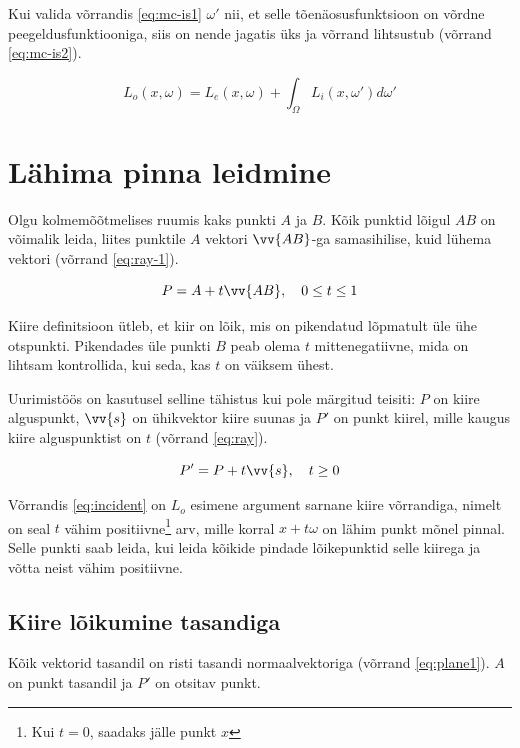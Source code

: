 \documentclass[a4paper,12pt]{report}
\renewcommand{\vec}[1]{\vv{#1}}
\begin{document}
Kui valida võrrandis \ref{eq:mc-is1} \(\omega'\) nii, et selle
tõenäosusfunktsioon on võrdne peegeldusfunktiooniga, siis on nende
jagatis üks ja võrrand lihtsustub (võrrand \ref{eq:mc-is2}).

\begin{equation} \label{eq:mc-is2}
L_o(x, \omega) = L_e(x, \omega) + \int_\Omega L_i(x, \omega') d\omega'
\end{equation}

\section{Lähima pinna leidmine}
Olgu kolmemõõtmelises ruumis kaks punkti \(A\) ja \(B\). Kõik punktid
lõigul \(AB\) on võimalik leida, liites punktile \(A\) vektori \(\vec{AB}\)-ga
samasihilise, kuid lühema vektori (võrrand \ref{eq:ray-1}).

\begin{equation} \label{eq:ray-1}
P = A + t\vec{AB}, \quad 0 \leq t \leq 1
\end{equation}

Kiire definitsioon ütleb, et kiir on lõik, mis on pikendatud lõpmatult
üle ühe otspunkti. Pikendades üle punkti \(B\) peab olema \(t\)
mittenegatiivne, mida on lihtsam kontrollida, kui seda, kas \(t\) on
väiksem ühest.

Uurimistöös on kasutusel selline tähistus kui pole märgitud teisiti:
\(P\) on kiire alguspunkt, \(\vec s\) on ühikvektor kiire suunas ja
\(P'\) on punkt kiirel, mille kaugus kiire alguspunktist on \(t\)
(võrrand \ref{eq:ray}).

\begin{equation} \label{eq:ray}
P' = P + t\vec s, \quad t \geq 0
\end{equation}

Võrrandis \ref{eq:incident} on \(L_o\) esimene argument sarnane kiire
võrrandiga, nimelt on seal \(t\) vähim positiivne\footnote{Kui \(t=0\),
saadaks jälle punkt \(x\)} arv, mille korral \(x + t\omega\) on lähim
punkt mõnel pinnal. Selle punkti saab leida, kui leida kõikide pindade
lõikepunktid selle kiirega ja võtta neist vähim positiivne.

\subsection{Kiire lõikumine tasandiga}
Kõik vektorid tasandil on risti tasandi normaalvektoriga (võrrand
\ref{eq:plane1}). \(A\) on punkt tasandil ja \(P'\) on otsitav punkt.
\end{document}
